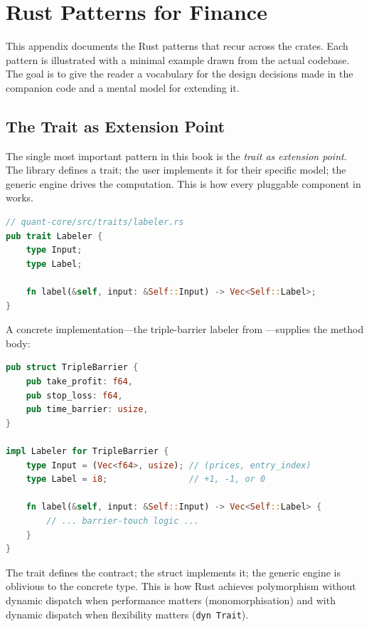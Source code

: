 \chapter{Rust Patterns for Finance}
\label{app:rust}

This appendix documents the Rust patterns that recur across the
 crates. Each pattern is illustrated with a minimal
example drawn from the actual codebase. The goal is to give the reader
a vocabulary for the design decisions made in the companion code and a
mental model for extending it.

\section{The Trait as Extension Point}

The single most important pattern in this book is the \emph{trait as
extension point}. The library defines a trait; the user implements it
for their specific model; the generic engine drives the computation.
This is how every pluggable component in  works.

\begin{lstlisting}[language=Rust]
// quant-core/src/traits/labeler.rs
pub trait Labeler {
    type Input;
    type Label;

    fn label(&self, input: &Self::Input) -> Vec<Self::Label>;
}
\end{lstlisting}

A concrete implementation---the triple-barrier labeler from
---supplies the method body:

\begin{lstlisting}[language=Rust]
pub struct TripleBarrier {
    pub take_profit: f64,
    pub stop_loss: f64,
    pub time_barrier: usize,
}

impl Labeler for TripleBarrier {
    type Input = (Vec<f64>, usize); // (prices, entry_index)
    type Label = i8;                // +1, -1, or 0

    fn label(&self, input: &Self::Input) -> Vec<Self::Label> {
        // ... barrier-touch logic ...
    }
}
\end{lstlisting}

\begin{keyinsight}
The trait defines the contract; the struct implements it; the generic
engine is oblivious to the concrete type. This is how Rust achieves
polymorphism without dynamic dispatch when performance matters
(monomorphisation) and with dynamic dispatch when flexibility matters
(\texttt{dyn Trait}).
\end{keyinsight}

